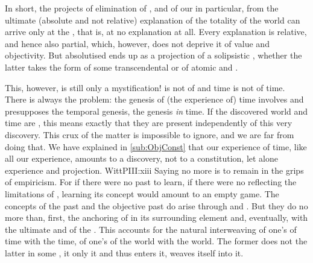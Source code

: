 In short, the projects of elimination of , and of our
 in particular, from the ultimate (absolute and not relative)
explanation of the totality of the world can arrive only at the , that is, at no explanation at all. Every explanation is relative, and
hence also partial, which, however, does not deprive it of value and
objectivity. But absolutised  ends up as a projection of a
solipsistic , whether the latter takes the form of some
transcendental  or of atomic  and
.


\pa This, however, is still only a mystification!  is not
 of  and  time is not
 of  time. 
%
There is always the problem: the genesis of (the experience of) time involves
and presupposes the temporal genesis, the genesis {\em in} time. If the
discovered world and time are , this means exactly that they are
present independently of this very discovery. This crux of the matter is
impossible to ignore, and we are far from doing that. We have explained in
\ref{sub:ObjConst} that our experience of time, like all our experience, amounts
to a discovery, not to a constitution, let alone  experience and
projection.  \citet{Man learns the concept of the past by
  remembering.}{WittPI}{II:xiii} Saying no more is to remain in the grips of
empiricism. For if there were
no past to learn, if there were no  reflecting the limitations of
, learning its concept would amount to an empty game. The concepts 
of the past and the objective past do arise through  and .  But they do no more than, first,
 the anchoring of  in its surrounding element
and, eventually,  with the ultimate  and
 of the .  This accounts for the natural interweaving
of one's  of time with the  time, of one's
 of the world with the  world. The former does not
 the latter in some , it only
 it and thus enters it, weaves itself into it.

